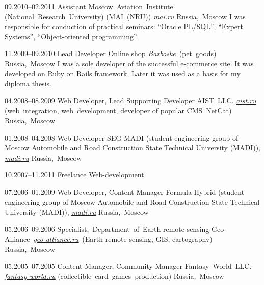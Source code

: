 \documentclass[12pt,a4paper,oneside,final]{moderncv}
\begin{document}
\cventry
{09.2010--02.2011}
{Assistant}
{
  Moscow~Aviation~Institute (National~Research~University) (MAI~(NRU)) \underline{\href{http://mai.ru}{\itshape mai.ru}}
}
{Russia,~Moscow}
{}
{
  I was responsible for conduction of practical seminars: ``Oracle PL/SQL'', ``Expert Systems'', ``Object-oriented programming''.
}


\cventry
{11.2009--09.2010}
{Lead Developer}
{Online shop \underline{\href{http://barboske.ru}{\itshape Barboske}}~(pet~goods)}
{Russia,~Moscow}
{}
{
  I was a sole developer of the successful e-commerce site. It was developed on Ruby on Rails framework. Later it was used as a basis for my diploma thesis.
}


\cventry
{04.2008--08.2009}
{Web Developer, Lead Supporting Developer}
{
  AIST~LLC. \underline{\href{http://aist.ru}{\itshape aist.ru}} (web~integration, web~development, developer of popular CMS~NetCat)
}
{Russia,~Moscow}
{}
{}


\cventry
{01.2008--04.2008}
{Web Developer}
{
  SEG MADI (student engineering group of Moscow Automobile and Road Construction State Technical University (MADI)), \underline{\href{http://madi.ru}{\itshape madi.ru}}
}
{Russia,~Moscow}
{}
{}


\cventry
{10.2007--11.2011}
{Freelance Web-development}{}{}{}{}


\cventry
{07.2006--01.2009}
{Web Developer, Content Manager}
{
  Formula Hybrid (student engineering group of Moscow Automobile and Road Construction State Technical University (MADI)), \underline{\href{http://madi.ru}{\itshape madi.ru}}
}
{Russia,~Moscow}
{}
{}


\cventry
{05.2006--09.2006}
{Specialist,~Department~of~Earth remote sensing}
{
  Geo-Alliance~\underline{\href{http://geo-alliance.ru}{\itshape geo-alliance.ru}}~(Earth remote sensing, GIS, cartography)
}
{Russia,~Moscow}
{}
{}


\cventry
{05.2005--07.2005}
{Content Manager, Community Manager}
{Fantasy~World~LLC. \underline{\href{http://fantasy-world.ru}{\itshape fantasy-world.ru}} (collectible~card~games~production)}
{Russia,~Moscow}
{}
{}
\end{document}
